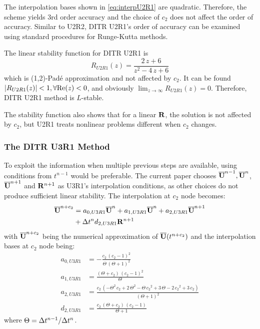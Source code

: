 \documentclass[preprint,12pt]{elsarticle}
\begin{document}
The interpolation bases shown in \eqref{eq:interpU2R1}
are quadratic.
Therefore, the scheme yields 3rd order accuracy
and the choice of $c_2$ does not affect the order of accuracy.
Similar to U2R2, DITR U2R1's order of accuracy can
be examined using
standard procedures for
Runge-Kutta methods\cite{wanner1996solving}.

The linear stability function for DITR U2R1 is
\begin{equation}
    \label{eq:stabilityFuncU2R1}
    R_{U2R1}(z) = \frac{2\,z+6}{z^2-4\,z+6}
\end{equation}
which is (1,2)-Pad{\'e} approximation and not affected by $c_2$.
It can be found $|R_{U2R1}(z)| < 1, \forall \mathrm{Re}(z) < 0$,
and obviously $\lim_{z\rightarrow\infty}R_{U2R1}(z) = 0$.
Therefore, DITR U2R1 method is $L$-stable.

The stability function also
shows that for a linear $\mathbf{R}$, the solution is not
affected by $c_2$, but U2R1 treats nonlinear problems
different when $c_2$ changes.

\subsubsection{The DITR U3R1 Method}

To exploit the information when multiple previous
steps are available,
using conditions from $t^{n-1}$ would be
preferable.
The current paper chooses $\overline{\mathbf{U}}^{n-1},\overline{\mathbf{U}}^{n}$, $\overline{\mathbf{U}}^{n+1}$
and $\mathbf{R}^{n+1}$ as U3R1's interpolation conditions,
as other choices do not produce sufficient linear stability.
The interpolation at $c_2$ node becomes:
\begin{equation}
    \begin{aligned}
        \label{eq:TRU3R1}
        \overline{\mathbf{U}}^{n+c_2} & =
        a_{0,U3R1}\overline{\mathbf{U}}^{n} +
        a_{1,U3R1}\overline{\mathbf{U}}^{n} +
        a_{2,U3R1}\overline{\mathbf{U}}^{n + 1}
        \\ & +
        \mathrm\Delta t^n d_{2,U3R1}\mathbf{R}^{n + 1}
    \end{aligned}
\end{equation}
with $\overline{\mathbf{U}}^{n+c_2}$ being
the numerical approximation
of $\overline{\mathbf{U}}(t^{n+c_2})$
and the interpolation bases at $c_2$ node being:
\begin{equation}
    \begin{aligned}
        a_{0,U3R1} & = -\frac{c_{2}\,{\left(c_{2}-1\right)}^2}{\Theta\,{\left(\Theta+1\right)}^2}                                                            \\
        a_{1,U3R1} & = \frac{\left(\Theta+c_{2}\right)\,{\left(c_{2}-1\right)}^2}{\Theta}                                                                    \\
        a_{2,U3R1} & =  \frac{c_{2}\,\left(-\Theta^2\,c_{2}+2\,\Theta^2-\Theta\,{c_{2}}^2+3\,\Theta-2\,{c_{2}}^2+3\,c_{2}\right)}{{\left(\Theta+1\right)}^2} \\
        d_{2,U3R1} & =   \frac{c_{2}\,\left(\Theta+c_{2}\right)\,\left(c_{2}-1\right)}{\Theta+1}
    \end{aligned}
    \label{eq:interpU3R1}
\end{equation}
where $\Theta = \mathrm\Delta t^{n-1}/\mathrm\Delta t^{n}$.
\end{document}
